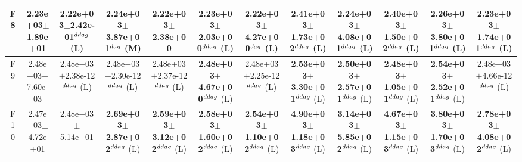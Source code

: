 \begin{table}[!t]
\begin{tabular}{c|ccccccccccc}
F8  & 2.23e+03$\pm$1.89e+01  & 2.22e+03$\pm$2.42e-01$^{\\ddag}$ (L)  & \textbf{2.24e+03$\pm$3.87e+01}$^{\\dag}$ (M)  & 2.22e+03$\pm$2.38e+00   & 2.23e+03$\pm$2.03e+00$^{\\ddag}$ (L)  & 2.22e+03$\pm$4.27e+00$^{\\dag}$ (L)  & \textbf{2.41e+03$\pm$1.73e+02}$^{\\ddag}$ (L)  & \textbf{2.24e+03$\pm$4.08e+01}$^{\\ddag}$ (L)  & \textbf{2.40e+03$\pm$1.50e+02}$^{\\ddag}$ (L)  & \textbf{2.26e+03$\pm$3.80e+01}$^{\\ddag}$ (L)  & \textbf{2.23e+03$\pm$1.74e+01}$^{\\ddag}$ (L) \\ \hline
F9  & 2.48e+03$\pm$7.60e-03  & 2.48e+03$\pm$2.38e-12$^{\\ddag}$ (L)  & 2.48e+03$\pm$2.30e-12$^{\\ddag}$ (L)  & 2.48e+03$\pm$2.37e-12$^{\\ddag}$ (L)  & \textbf{2.48e+03$\pm$4.67e+00}$^{\\ddag}$ (L)  & 2.48e+03$\pm$2.25e-12$^{\\ddag}$ (L)  & \textbf{2.53e+03$\pm$3.30e+01}$^{\\ddag}$ (L)  & \textbf{2.50e+03$\pm$2.57e+01}$^{\\ddag}$ (L)  & \textbf{2.48e+03$\pm$1.05e+01}$^{\\ddag}$ (L)  & \textbf{2.54e+03$\pm$2.52e+01}$^{\\ddag}$ (L)  & 2.48e+03$\pm$4.66e-12$^{\\ddag}$ (L) \\ \hline
F10  & 2.47e+03$\pm$4.72e+01  & 2.48e+03$\pm$5.14e+01   & \textbf{2.69e+03$\pm$2.87e+02}$^{\\ddag}$ (L)  & \textbf{2.59e+03$\pm$3.12e+02}$^{\\ddag}$ (L)  & \textbf{2.58e+03$\pm$1.60e+02}$^{\\ddag}$ (L)  & \textbf{2.54e+03$\pm$1.10e+02}$^{\\ddag}$ (L)  & \textbf{4.90e+03$\pm$1.18e+03}$^{\\ddag}$ (L)  & \textbf{3.14e+03$\pm$5.85e+02}$^{\\ddag}$ (L)  & \textbf{4.67e+03$\pm$1.15e+03}$^{\\ddag}$ (L)  & \textbf{3.80e+03$\pm$1.70e+03}$^{\\ddag}$ (L)  & \textbf{2.78e+03$\pm$4.08e+02}$^{\\ddag}$ (L) \\ \hline

\end{tabular}
\end{table}
